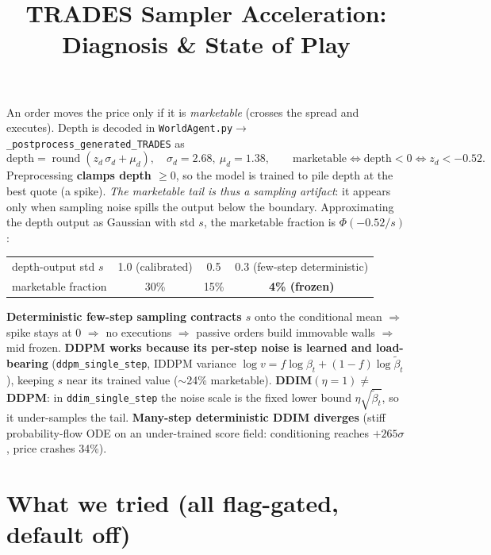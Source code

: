 \documentclass[11pt]{article}
\title{\vspace{-2em}TRADES Sampler Acceleration: Diagnosis \& State of Play}
\author{}\date{\vspace{-3em}}
\newcommand{\code}[1]{\texttt{\small #1}}
\begin{document}
\maketitle\vspace{-2em}

An order moves the price only if it is \emph{marketable} (crosses the spread and executes). Depth
is decoded in \code{WorldAgent.py}$\to$\code{\_postprocess\_generated\_TRADES} as
\[
\text{depth} = \operatorname{round}(z_d\,\sigma_d + \mu_d), \quad \sigma_d=2.68,\ \mu_d=1.38,
\qquad\text{marketable}\iff \text{depth}<0 \iff z_d<-0.52 .
\]
Preprocessing \textbf{clamps depth $\ge 0$}, so the model is trained to pile depth at the best
quote (a spike). \emph{The marketable tail is thus a sampling artifact}: it appears only when
sampling noise spills the output below the boundary. Approximating the depth output as Gaussian
with std $s$, the marketable fraction is $\Phi(-0.52/s)$:
\begin{center}
\begin{tabular}{lccc}
\toprule
depth-output std $s$ & 1.0 (calibrated) & 0.5 & 0.3 (few-step deterministic)\\
marketable fraction & 30\% & 15\% & \textbf{4\% (frozen)}\\
\bottomrule
\end{tabular}
\end{center}

\textbf{Deterministic few-step sampling contracts $s$} onto the conditional mean $\Rightarrow$ spike
stays at 0 $\Rightarrow$ no executions $\Rightarrow$ passive orders build immovable walls
$\Rightarrow$ mid frozen. \textbf{DDPM works because its per-step noise is learned and load-bearing}
(\code{ddpm\_single\_step}, IDDPM variance $\log v = f\log\beta_t+(1-f)\log\tilde\beta_t$), keeping
$s$ near its trained value ($\sim$24\% marketable). \textbf{DDIM$(\eta{=}1)\neq$ DDPM}: in
\code{ddim\_single\_step} the noise scale is the fixed lower bound $\eta\sqrt{\tilde\beta_t}$, so it
under-samples the tail. \textbf{Many-step deterministic DDIM diverges} (stiff probability-flow ODE
on an under-trained score field: conditioning reaches $+265\sigma$, price crashes 34\%).

\section{What we tried (all flag-gated, default off)}
\end{document}
